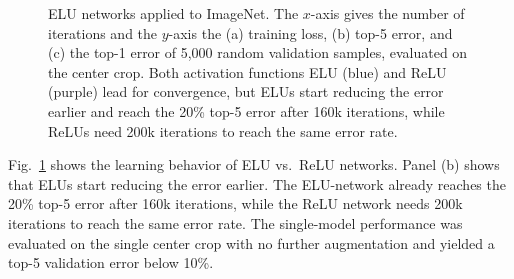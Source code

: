 \documentclass{article}
\begin{document}
\begin{figure}[!ht]
\begin{center}
\caption{ ELU networks applied to ImageNet.
The $x$-axis gives the number of iterations and the $y$-axis the (a)
training loss, (b) top-5 error, and (c) the top-1 error
of 5,000 random validation samples, evaluated on the center crop.
Both activation functions ELU (blue) and ReLU (purple) lead for
convergence, but ELUs start reducing the error earlier and
reach the 20\% top-5 error after 160k iterations,
while ReLUs need 200k iterations to reach the same error rate. \label{fig:resImageNet}}
\end{center}
\vspace*{-5pt}
\end{figure}

Fig.~\ref{fig:resImageNet} shows the learning behavior of
ELU vs.\ ReLU networks.
Panel (b) shows that ELUs start reducing the error earlier.
The ELU-network already reaches the 20\% top-5 error after 160k
iterations, while the ReLU network needs 200k
iterations to reach the same error rate.
The single-model performance was evaluated on the single center crop
with no further augmentation and yielded a top-5 validation error
below 10\%.
\end{document}

